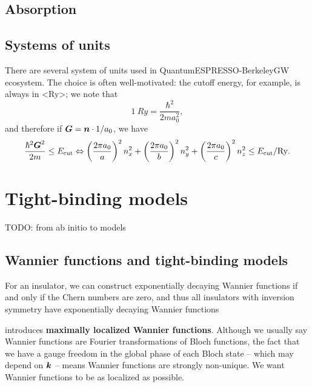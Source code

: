 \documentclass[hyperref, a4paper, 12pt]{report}
\newcommand*{\concept}[1]{{\textbf{#1}}}
\def\ce#1{<#1>}%
\begin{document}
\section{Absorption}

\subsection{}

\section{Systems of units}

There are several system of units used in QuantumESPRESSO-BerkeleyGW ecosystem.
The choice is often well-motivated: 
the cutoff energy, for example, 
is always in \ce{Ry};
we note that 
\begin{equation}
    \SI{1}{Ry} = \frac{\hbar^2}{2 m a_0^2},
\end{equation}
and therefore if $\vb*{G} = \vb*{n} \cdot 1 / a_0$, we have 
\begin{equation}
    \frac{\hbar^2 \vb*{G}^2}{2m} \leq E_{\text{cut}} \Leftrightarrow
    \left(\frac{2\pi a_0}{a}\right)^2 n_x^2 + \left(\frac{2 \pi a_0}{b}\right)^2 n_y^2 + \left(\frac{2 \pi a_0}{c}\right)^2 n_z^2 \leq E_{\text{cut}} / \unit{Ry}.
\end{equation}

\chapter{Tight-binding models}

TODO: from ab initio to models

\section{Wannier functions and tight-binding models}

For an insulator,
we can construct exponentially decaying Wannier functions 
if and only if the Chern numbers are zero, 
and thus all insulators with inversion symmetry 
have exponentially decaying Wannier functions \cite{brouder2007exponential}

\cite{marzari2012maximally} introduces \concept{maximally localized Wannier functions}.
Although we usually say Wannier functions are Fourier transformations of Bloch functions,
the fact that we have a gauge freedom in the global phase of each Bloch state
-- which may depend on $\vb*{k}$ --  
means Wannier functions are strongly non-unique.
We want Wannier functions to be as localized as possible. 
\end{document}
